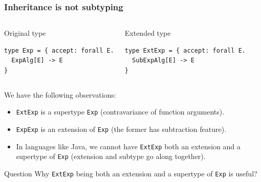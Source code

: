 \documentclass{beamer}
\begin{document}
\begin{frame}[fragile]
  \frametitle{Inheritance is not subtyping}

\begin{columns}[t]



\begin{exampleblock}{Original type}
\begin{lstlisting}
type Exp = { accept: forall E.
  ExpAlg[E] -> E
}
\end{lstlisting}
\end{exampleblock}



\begin{exampleblock}{Extended type}
\begin{lstlisting}
type ExtExp = { accept: forall E.
  SubExpAlg[E] -> E
}
\end{lstlisting}
\end{exampleblock}

\end{columns}

\vskip10pt

We have the following observations:

\pause

\begin{block}{}
  \begin{itemize}
  \item \lstinline{ExtExp} is a supertype \lstinline{Exp} (contravariance of
    function arguments).
  \item \lstinline{ExpExp} is an extension of \lstinline{Exp} (the former has
    subtraction feature).
  \item In languages like Java, we cannot have \lstinline{ExtExp} both an
    extension and a supertype of \lstinline{Exp} (extension and subtype go along
    together).
  \end{itemize}
\end{block}

\end{frame}

\begin{frame}

\begin{alertblock}{Question}
  Why \lstinline{ExtExp} being both an extension and a supertype of
  \lstinline{Exp} is useful?
\end{alertblock}

\end{frame}
\end{document}
